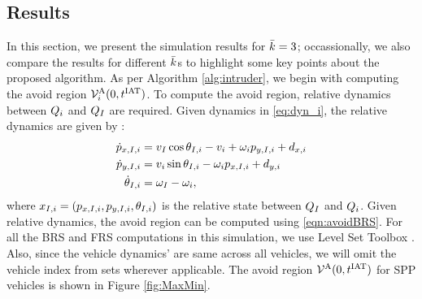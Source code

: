 \subsection{Results \label{sec:simResults}}
In this section, we present the simulation results for $\bar{k} = 3$; occassionally, we also compare the results for different $\bar{k}$s to highlight some key points about the proposed algorithm. As per Algorithm \ref{alg:intruder}, we begin with computing the avoid region $\mathcal{V}^{\text{A}}_{i}(0, t^\text{IAT})$. To compute the avoid region, relative dynamics between $Q_i$ and $Q_{I}$ are required. Given dynamics in \eqref{eq:dyn_i}, the relative dynamics are given by \cite{Mitchell05}:
\begin{equation}
\label{eq:reldyn_i}
\begin{aligned}
\dot{\pos}_{x, \intr, i} &= v_{\intr} \cos \theta_{\intr, i} - v_i + \omega_i {\pos}_{y, \intr, i} + d_{x,i} \\
\dot{\pos}_{y, \intr, i} &= v_i \sin \theta_{\intr, i} - \omega_i {\pos}_{x, \intr, i} + d_{y,i}\\
\dot{\theta}_{\intr, i} &= \omega_{\intr} - \omega_i,
\end{aligned}
\end{equation}
where $x_{I, i} = (p_{x, I, i}, p_{y, I, i}, \theta_{I, i})$ is the relative state between $Q_{I}$ and $Q_i$. Given relative dynamics, the avoid region can be computed using \eqref{eqn:avoidBRS}. For all the BRS and FRS computations in this simulation, we use Level Set Toolbox \cite{Mitchell07b}. Also, since the vehicle dynamics' are same across all vehicles, we will omit the vehicle index from sets wherever applicable. The avoid region $\mathcal{V}^{\text{A}}(0, t^\text{IAT})$ for SPP vehicles is shown in Figure \ref{fig:MaxMin}.
